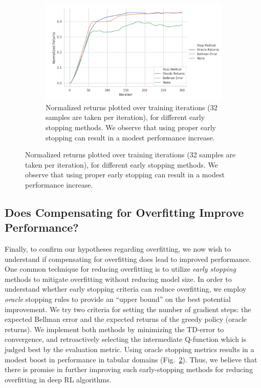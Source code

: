 \begin{figure}[ttt!]
\begin{subfigure}{0.31\linewidth}
\includegraphics[trim={0 0 4.4cm 0},clip,width=0.97\linewidth]{chapters/diagnosing_q/images/validation_stop}
\caption{\label{fig:validation_stop}Normalized returns plotted over training iterations (32 samples are taken per iteration), for different early stopping methods. We observe that using proper early stopping can result in a modest performance increase.}
\end{subfigure}
\end{figure}

\vspace{-0.2cm}
\subsection{Does Compensating for Overfitting Improve Performance?}
\vspace{-0.2cm}

Finally, to confirm our hypotheses regarding overfitting, we now wish to understand if compensating for overfitting does lead to improved performance. One common technique for reducing overfitting is to utilize \textit{early stopping} methods to mitigate overfitting without reducing model size.
In order to understand whether early stopping criteria can reduce overfitting, we employ \emph{oracle} stopping rules to provide an ``upper bound'' on the best potential improvement. We try two criteria for setting the number of gradient steps: the expected Bellman error and the expected returns of the greedy policy (oracle returns). We implement both methods by minimizing the TD-error to convergence, and retroactively selecting the intermediate Q-function which is judged best by the evaluation metric. Using oracle stopping metrics results in a modest boost in performance in tabular domains (Fig.~\ref{fig:validation_stop}). Thus, we believe that there is promise in further improving such early-stopping methods for reducing overfitting in deep RL algorithms.


